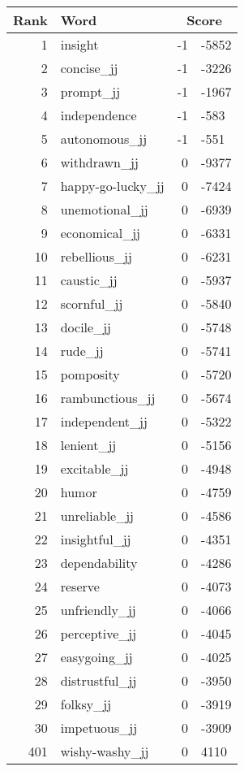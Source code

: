 \begin{longtable}[!htbp]{| rlr@{.}l |}
    \hline
    \textbf{Rank} & \textbf{Word} & \multicolumn{2}{c|}{\textbf{Score}} \\
    \hline
    \endhead
    1 & insight & -1 & -5852 \\
    2 & concise\_jj & -1 & -3226 \\
    3 & prompt\_jj & -1 & -1967 \\
    4 & independence & -1 & -583 \\
    5 & autonomous\_jj & -1 & -551 \\
    6 & withdrawn\_jj & 0 & -9377 \\
    7 & happy-go-lucky\_jj & 0 & -7424 \\
    8 & unemotional\_jj & 0 & -6939 \\
    9 & economical\_jj & 0 & -6331 \\
    10 & rebellious\_jj & 0 & -6231 \\
    11 & caustic\_jj & 0 & -5937 \\
    12 & scornful\_jj & 0 & -5840 \\
    13 & docile\_jj & 0 & -5748 \\
    14 & rude\_jj & 0 & -5741 \\
    15 & pomposity & 0 & -5720 \\
    16 & rambunctious\_jj & 0 & -5674 \\
    17 & independent\_jj & 0 & -5322 \\
    18 & lenient\_jj & 0 & -5156 \\
    19 & excitable\_jj & 0 & -4948 \\
    20 & humor & 0 & -4759 \\
    21 & unreliable\_jj & 0 & -4586 \\
    22 & insightful\_jj & 0 & -4351 \\
    23 & dependability & 0 & -4286 \\
    24 & reserve & 0 & -4073 \\
    25 & unfriendly\_jj & 0 & -4066 \\
    26 & perceptive\_jj & 0 & -4045 \\
    27 & easygoing\_jj & 0 & -4025 \\
    28 & distrustful\_jj & 0 & -3950 \\
    29 & folksy\_jj & 0 & -3919 \\
    30 & impetuous\_jj & 0 & -3909 \\
    401 & wishy-washy\_jj & 0 & 4110 \\

\end{longtable}
